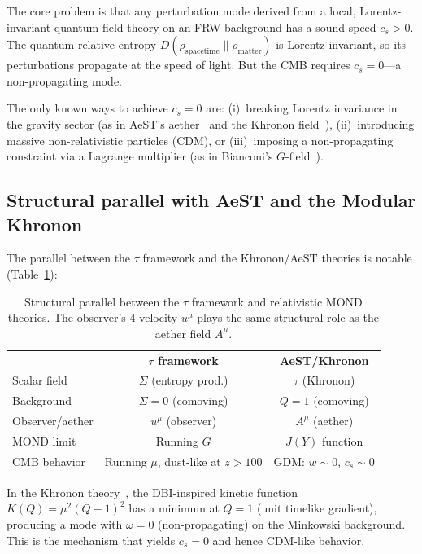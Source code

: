 \documentclass[prd,twocolumn,superscriptaddress,longbibliography,floatfix]{revtex4-2}
\newcommand{\KL}{D}
\newcommand{\tauasym}{\tau}
\begin{document}
The core problem is that any perturbation mode derived from a
local, Lorentz-invariant quantum field theory on an FRW
background has a sound speed $c_s > 0$.  The quantum relative
entropy $\KL(\rho_{\mathrm{spacetime}} \|
\rho_{\mathrm{matter}})$ is Lorentz invariant, so its
perturbations propagate at the speed of light.  But the CMB
requires $c_s = 0$---a non-propagating mode.

The only known ways to achieve $c_s = 0$ are: (i)~breaking
Lorentz invariance in the gravity sector (as in AeST's
aether~\cite{Skordis2021} and the Khronon
field~\cite{Blanchet2024}), (ii)~introducing massive
non-relativistic particles (CDM), or (iii)~imposing a
non-propagating constraint via a Lagrange multiplier (as in
Bianconi's $G$-field~\cite{Bianconi2025}).

\subsection{Structural parallel with AeST and the Modular
Khronon}

The parallel between the $\tauasym$ framework and the
Khronon/AeST theories is notable
(Table~\ref{tab:parallel}):

\begin{table}[t]
\caption{\label{tab:parallel}Structural parallel between the
$\tauasym$ framework and relativistic MOND theories.  The
observer's 4-velocity $u^\mu$ plays the same structural role
as the aether field $A^\mu$.}
\begin{ruledtabular}
\begin{tabular}{lcc}
& \textbf{$\tauasym$ framework} & \textbf{AeST/Khronon} \\
\colrule
Scalar field & $\Sigma$ (entropy prod.) &
$\tau$ (Khronon) \\
Background & $\Sigma = 0$ (comoving) &
$Q = 1$ (comoving) \\
Observer/aether & $u^\mu$ (observer) &
$A^\mu$ (aether) \\
MOND limit & Running $G$ &
$J(Y)$ function \\
CMB behavior & Running $\mu$, dust-like at $z > 100$ &
GDM: $w\!\sim\!0$, $c_s\!\sim\!0$ \\
\end{tabular}
\end{ruledtabular}
\end{table}

In the Khronon theory~\cite{Blanchet2024}, the DBI-inspired
kinetic function $K(Q) = \mu^2(Q-1)^2$ has a minimum at $Q = 1$
(unit timelike gradient), producing a mode with $\omega = 0$
(non-propagating) on the Minkowski background.  This is the
mechanism that yields $c_s = 0$ and hence CDM-like behavior.
\end{document}
